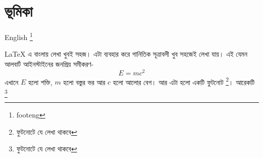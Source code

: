 \documentclass{article}
\begin{document}
\section*{ভূমিকা}


English \footnote[*]{footeng}

LaTeX এ বাংলায় লেখা খুবই সহজ। এটা ব্যবহার করে গানিতিক সূত্রাবলী খুব সহজেই লেখা যায়। 
 এই যেমন আলবার্ট আইনস্টাইনের জনপ্রিয় সমীকরণ-
\begin{equation}
E=mc^2
\end{equation} 
এখানে $E$ হলো শক্তি, $m$ হলো বস্তুর ভর আর $c$ হলো আলোর বেগ। আর এটা হলো একটি ফুটনোট \footnote[*]{ফুটনোটে যে লেখা থাকবে}। আরেকটি \footnote[**]{ফুটনোটে যে লেখা থাকবে}
\end{document}
